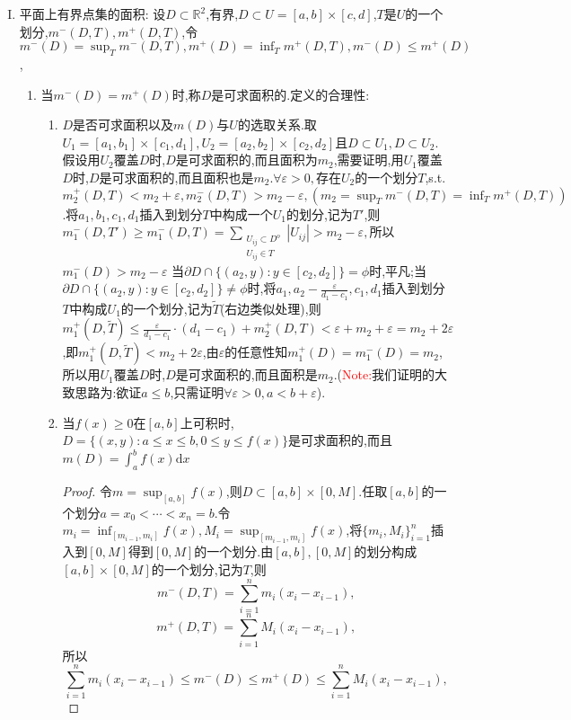 \documentclass[UTF8]{ctexart}
\renewcommand{\d}{\mathrm{d}}
\begin{document}
        
    \begin{enumerate}[I)]
        \item 平面上有界点集的面积:
        设$D\subset\mathbb{R}^2$,有界,$D\subset U=[a,b]\times[c,d]$,$T$是$U$的一个划分,$m^-(D,T),m^+(D,T)$,令$m^-(D)=\sup_Tm^-(D,T),m^+(D)=\inf_Tm^+(D,T),m^-(D)\le m^+(D)$,
        \begin{enumerate}[$\cdot$)]
            \item 当$m^-(D)=m^+(D)$时,称$D$是可求面积的.定义的合理性:
            \begin{enumerate}[1)]
                \item $D$是否可求面积以及$m(D)$与$U$的选取关系.取$U_1=[a_1,b_1]\times[c_1,d_1],U_2=[a_2,b_2]\times[c_2,d_2]$且$D\subset U_1,D\subset U_2$.假设用$U_2$覆盖$D$时,$D$是可求面积的,而且面积为$m_2$,需要证明,用$U_1$覆盖$D$时,$D$是可求面积的,而且面积也是$m_2.\forall\varepsilon>0,$存在$U_2$的一个划分$T$,s.t.$m_2^+(D,T)<m_2+\varepsilon,m_2^-(D,T)>m_2-\varepsilon,(m_2=\sup_Tm^-(D,T)=\inf_Tm^+(D,T))$.将$a_1,b_1,c_1,d_1$插入到划分$T$中构成一个$U_1$的划分,记为$T'$,则$m_1^-(D,T')\ge m_1^-(D,T)=\sum_{\substack{U_{ij}\subset D^o\\ U_{ij}\in T}}|U_{ij}|>m_2-\varepsilon,$所以$m_1^-(D)>m_2-\varepsilon$
                当$\partial D\cap \{(a_2,y):y\in[c_2,d_2]\}=\phi$时,平凡;当$\partial D\cap \{(a_2,y):y\in[c_2,d_2]\}\not=\phi$时,将$a_1,a_2-\frac{\varepsilon}{d_1-c_1},c_1,d_1$插入到划分$T$中构成$U_1$的一个划分,记为$\tilde{T}$(右边类似处理),则$m_1^+(D,\tilde{T})\le \frac{\varepsilon}{d_1-c_1}\cdot(d_1-c_1)+m_2^+(D,T)<\varepsilon+m_2+\varepsilon=m_2+2\varepsilon$,即$m_1^+(D,\tilde{T})<m_2+2\varepsilon$,由$\varepsilon$的任意性知$m_1^+(D)=m_1^-(D)=m_2$,所以用$U_1$覆盖$D$时,$D$是可求面积的,而且面积是$m_2$.(\textcolor{red}{Note:}我们证明的大致思路为:欲证$a\le b$,只需证明$\forall\varepsilon>0,a<b+\varepsilon$).
                \item 当$f(x)\ge 0$在$[a,b]$上可积时,$D=\{(x,y):a\le x\le b,0\le y\le f(x)\}$是可求面积的,而且$m(D)=\int_a^bf(x)\d x$
                \begin{proof}
                    令$m=\sup_{[a,b]}f(x)$,则$D\subset[a,b]\times[0,M]$.任取$[a,b]$的一个划分$a=x_0<\cdots<x_n=b$.令$m_i=\inf_{[m_{i-1},m_i]}f(x),M_i=\sup_{[m_{i-1},m_i]}f(x)$,将$\{m_i,M_i\}_{i=1}^n$插入到$[0,M]$得到$[0,M]$的一个划分.由$[a,b],[0,M]$的划分构成$[a,b]\times[0,M]$的一个划分,记为$T$,则$$m^-(D,T)=\sum_{i=1}^nm_i(x_i-x_{i-1}),$$
                    $$m^+(D,T)=\sum_{i=1}^nM_i(x_i-x_{i-1}),$$
                    所以$$\sum_{i=1}^nm_i(x_i-x_{i-1})\le m^-(D)\le m^+(D)\le \sum_{i=1}^nM_i(x_i-x_{i-1}),$$

\end{proof}
\end{enumerate}
\end{enumerate}
\end{enumerate}
\end{document}
